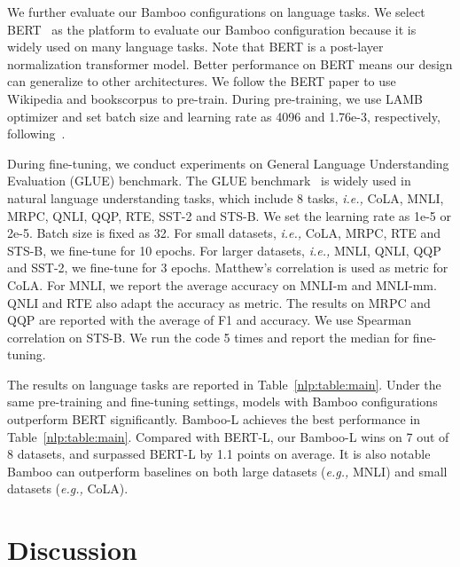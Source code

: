 \documentclass{article}
\theoremstyle{plain}
\theoremstyle{definition}
\theoremstyle{remark}
\newcommand{\ie}{\emph{i.e.,}\xspace}
\newcommand{\eg}{\emph{e.g.,}\xspace}
\begin{document}
We further evaluate our Bamboo configurations on language tasks. We select BERT~\citep{devlin2018bert} as the platform to evaluate our Bamboo configuration because it is widely used on many language tasks. Note that BERT is a post-layer normalization transformer model. Better performance on BERT means our design can generalize to other architectures. We follow the BERT paper to use Wikipedia and bookscorpus to pre-train. During pre-training, we use LAMB optimizer and set batch size and learning rate as 4096 and 1.76e-3, respectively, following~\citet{you2019large}.



During fine-tuning, we conduct experiments on General Language Understanding Evaluation (GLUE) benchmark.
The GLUE benchmark~\citep{wang-etal-2018-glue} is widely used in natural language understanding tasks, which include 8 tasks, \ie CoLA, MNLI, MRPC, QNLI, QQP, RTE, SST-2 and STS-B. We set the learning rate as 1e-5 or 2e-5. Batch size is fixed as 32. For small datasets, \ie CoLA, MRPC, RTE and STS-B, we fine-tune for 10 epochs. For larger datasets, \ie MNLI, QNLI, QQP and SST-2, we fine-tune for 3 epochs. Matthew’s correlation is used as metric for CoLA. For MNLI, we report the average accuracy on MNLI-m and MNLI-mm. QNLI and RTE also adapt the accuracy as metric. The results on MRPC and QQP are reported with the average of F1 and accuracy. We use Spearman correlation on STS-B. We run the code 5 times and report the median for fine-tuning.







The results on language tasks are reported in Table~\ref{nlp:table:main}. Under the same pre-training and fine-tuning settings, models with Bamboo configurations outperform BERT significantly. Bamboo-L achieves the best performance in Table~\ref{nlp:table:main}. Compared with BERT-L, our Bamboo-L wins on 7 out of 8 datasets, and surpassed BERT-L by 1.1 points on average. It is also notable Bamboo can outperform baselines on both large datasets (\eg MNLI) and small datasets (\eg CoLA).


\section{Discussion}\label{Discussion}
\end{document}
